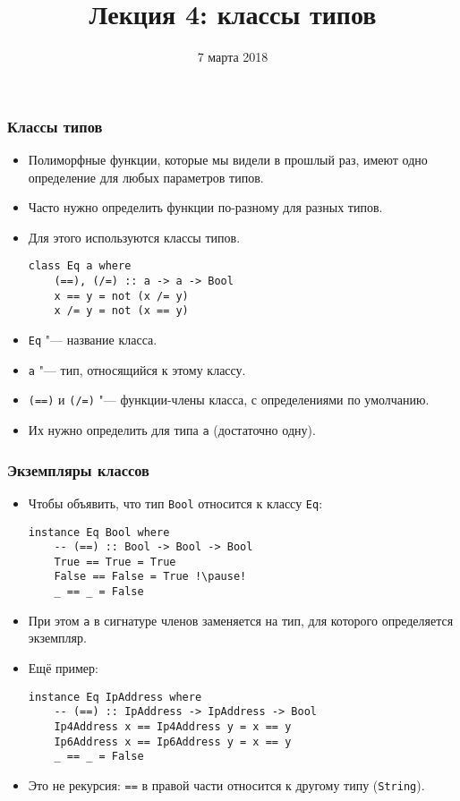 \documentclass[10pt]{beamer}
\title{Лекция 4: классы типов}
\date{7 марта 2018}
\begin{document}
\begin{frame}[plain]
\maketitle
\end{frame}

\begin{frame}[fragile]
\frametitle{Классы типов}
\begin{itemize}
    \item Полиморфные функции, которые мы видели в прошлый раз, имеют одно определение для любых параметров типов.
    \item Часто нужно определить функции по-разному для разных типов.
    \item Для этого используются классы типов.
\begin{lstlisting}[basicstyle=\ttfamily\small]
class Eq a where
    (==), (/=) :: a -> a -> Bool
    x == y = not (x /= y)
    x /= y = not (x == y)
\end{lstlisting}
    \item \lstinline|Eq| "--- название класса.
    \item \lstinline|a| "--- тип, относящийся к этому классу.
    \item \lstinline|(==)| и \lstinline|(/=)| "--- функции-члены класса, с определениями по умолчанию.
    \item Их нужно определить для типа \lstinline|a| \pause(достаточно одну).
\end{itemize}
\end{frame}

\begin{frame}[fragile]
\frametitle{Экземпляры классов}
\begin{itemize}
    \item Чтобы объявить, что тип \lstinline|Bool| относится к классу \lstinline|Eq|:
\begin{lstlisting}[basicstyle=\ttfamily\small]
instance Eq Bool where
    -- (==) :: Bool -> Bool -> Bool
    True == True = True
    False == False = True !\pause!
    _ == _ = False
\end{lstlisting}
    \item При этом \lstinline|a| в сигнатуре членов заменяется на тип, для которого определяется экземпляр.
    \item Ещё пример:\pause
\begin{lstlisting}[basicstyle=\ttfamily\small]
instance Eq IpAddress where
    -- (==) :: IpAddress -> IpAddress -> Bool
    Ip4Address x == Ip4Address y = x == y
    Ip6Address x == Ip6Address y = x == y
    _ == _ = False
\end{lstlisting}
    \item<4-> Это не рекурсия: \lstinline|==| в правой части относится к другому типу (\lstinline|String|).
\end{itemize}
\end{frame}
\end{document}
